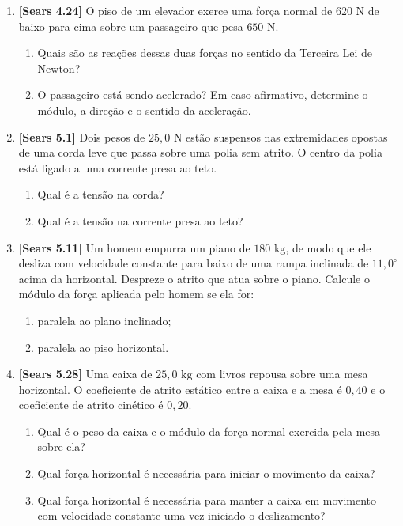 \documentclass[11pt,a4paper]{article}
\begin{document}
\begin{enumerate}[label=\textbf{\arabic*.}, leftmargin=*, itemsep=0.45cm]
\item \textbf{[Sears 4.24]} O piso de um elevador exerce uma força normal de $620\text{ N}$ de baixo para cima sobre um passageiro que pesa $650\text{ N}$.
\begin{enumerate}[label=\alph*)]
    \item Quais são as reações dessas duas forças no sentido da Terceira Lei de Newton?
    \item O passageiro está sendo acelerado? Em caso afirmativo, determine o módulo, a direção e o sentido da aceleração.
\end{enumerate}

\item \textbf{[Sears 5.1]} Dois pesos de $25,0\text{ N}$ estão suspensos nas extremidades opostas de uma corda leve que passa sobre uma polia sem atrito. O centro da polia está ligado a uma corrente presa ao teto.
\begin{enumerate}[label=\alph*)]
    \item Qual é a tensão na corda?
    \item Qual é a tensão na corrente presa ao teto?
\end{enumerate}

\item \textbf{[Sears 5.11]} Um homem empurra um piano de $180\text{ kg}$, de modo que ele desliza com velocidade constante para baixo de uma rampa inclinada de $11,0^\circ$ acima da horizontal. Despreze o atrito que atua sobre o piano. Calcule o módulo da força aplicada pelo homem se ela for:
\begin{enumerate}[label=\alph*)]
    \item paralela ao plano inclinado;
    \item paralela ao piso horizontal.
\end{enumerate}

\item \textbf{[Sears 5.28]} Uma caixa de $25,0\text{ kg}$ com livros repousa sobre uma mesa horizontal. O coeficiente de atrito estático entre a caixa e a mesa é $0,40$ e o coeficiente de atrito cinético é $0,20$.
\begin{enumerate}[label=\alph*)]
    \item Qual é o peso da caixa e o módulo da força normal exercida pela mesa sobre ela?
    \item Qual força horizontal é necessária para iniciar o movimento da caixa?
    \item Qual força horizontal é necessária para manter a caixa em movimento com velocidade constante uma vez iniciado o deslizamento?
\end{enumerate}

\end{enumerate}
\end{document}
